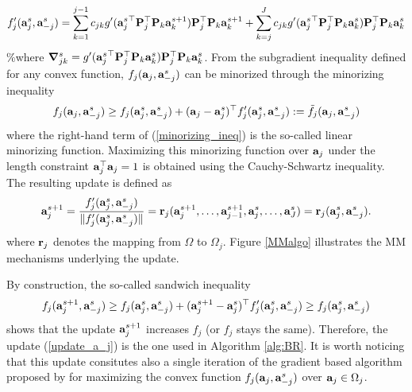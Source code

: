 \documentclass[
]{jss}
\begin{document}
\begin{equation}
  \displaystyle f_j'(\mathbf{a}_j^s, \mathbf{a}_{-j}^s) = \sum_{k=1}^{j-1}c_{jk} 
g'({\mathbf{a}_j^s}^\top\mathbf{P}_j^\top\mathbf{P}_k\mathbf{a}_k^{s+1})\mathbf{P}_j^\top\mathbf{P}_k\mathbf{a}_k^{s+1} +\sum_{k=j}^J c_{jk} 
g'({\mathbf{a}_j^s}^\top\mathbf{P}_j^\top\mathbf{P}_k\mathbf{a}_k^{s})\mathbf{P}_j^\top\mathbf{P}_k\mathbf{a}_k^{s}
\end{equation} \%where
\(\boldsymbol{\nabla}_{jk}^s = g'({\mathbf{a}_j^s}^\top\mathbf{P}_j^\top\mathbf{P}_k\mathbf{a}_k^{s})\mathbf{P}_j^\top\mathbf{P}_k\mathbf{a}_k^{s}\).
From the subgradient inequality defined for any convex function,
\(f_j(\mathbf{a}_j, \mathbf{a}_{-j}^s)\) can be minorized through the minorizing
inequality \begin{equation}
  f_j(\mathbf{a}_j, \mathbf{a}_{-j}^s) \geq f_j(\mathbf{a}_j^s, \mathbf{a}_{-j}^s) + (\mathbf{a}_j-\mathbf{a}_j^s)^\top  f_j'(\mathbf{a}_j^s, \mathbf{a}_{-j}^s) := \tilde{f}_j (\mathbf{a}_j, \mathbf{a}_{-j}^s)
  \label{minorizing_ineq}
\end{equation} where the right-hand term of (\ref{minorizing_ineq}) is
the so-called linear minorizing function. Maximizing this minorizing
function over \(\mathbf{a}_j\) under the length constraint
\(\mathbf{a}_j^\top \mathbf{a}_j = 1\) is obtained using the Cauchy-Schwartz
inequality. The resulting update is defined as \begin{equation}
  \mathbf{a}_j^{s+1} = \frac{f_j'(\mathbf{a}_j^s, \mathbf{a}_{-j}^s)}{\Vert f_j'(\mathbf{a}_j^s, \mathbf{a}_{-j}^s) \Vert} = \mathbf{r}_j(\mathbf{a}_j^{s+1}, \ldots, \mathbf{a}_{j-1}^{s+1}, \mathbf{a}_j^s, \ldots, \mathbf{a}_J^s) = \mathbf{r}_j(\mathbf{a}_j^s, \mathbf{a}_{-j}^s).
  \label{update_a_j}
\end{equation} where \(\mathbf{r}_j\) denotes the mapping from \(\Omega\) to
\(\Omega_j\). Figure \ref{MMalgo} illustrates the MM mechanisms
underlying the update.

By construction, the so-called sandwich inequality \begin{equation}
   f_j(\mathbf{a}_j^{s+1}, \mathbf{a}_{-j}^s) \geq f_j(\mathbf{a}_j^s, \mathbf{a}_{-j}^s) + 
(\mathbf{a}_j^{s+1}-\mathbf{a}_j^s)^\top f_j'(\mathbf{a}_j^s, \mathbf{a}_{-j}^s)  \geq f_j(\mathbf{a}_j^s, \mathbf{a}_{-j}^s)
   \label{sandwich_ineq}
\end{equation} shows that the update \(\mathbf{a}_j^{s+1}\) increases
\(f_j\) (or \(f_j\) stays the same). Therefore, the update
(\ref{update_a_j}) is the one used in Algorithm \ref{alg:BR}. It is
worth noticing that this update consitutes also a single iteration of
the gradient based algorithm proposed by \citep{Journee2010} for
maximizing the convex function \(f_j(\mathbf{a}_j, \mathbf{a}_{-j}^s)\) over
\(\mathbf{a}_j \in \Omega_j\).
\end{document}
